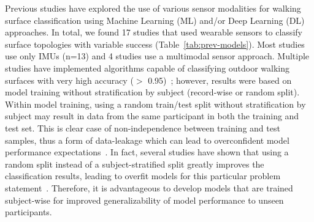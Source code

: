 \documentclass[sensors,article,submit,pdftex,moreauthors]{Definitions/mdpi}
\begin{document}
Previous studies have explored the use of various sensor modalities for walking surface classification using Machine Learning (ML) and/or Deep Learning (DL) approaches. \textcolor{revision}{In total, we found 17 studies that used wearable sensors to classify surface topologies with variable success (Table~\ref{tab:prev-models}). Most studies use only IMUs (n=13) and 4 studies use a multimodal sensor approach.}
Multiple studies have implemented algorithms capable of classifying outdoor walking surfaces with very high accuracy ($>$ 0.95)~\cite{Shah_2022, chauhan2025classifying, yildiz2023towards, Hu_2021, worsey2021automatic, camargo2021machine, kim2021classification, shin2021locomotion, seo2025gait}\textcolor{revision}{; however, results were based on model training without stratification by subject (record-wise or random split). 
Within model training, using a random train/test split without stratification by subject may result in data from the same participant in both the training and test set. \textcolor{revision2}{This is clear case of non-independence between training and test samples, thus a form of data-leakage which can lead to overconfident model performance expectations~\cite{kapoor2023leakage}.} \textcolor{revision2}{In fact,} several studies have shown that using \textcolor{revision2}{a random split instead of a subject-stratified split} greatly improves the classification results, \textcolor{revision2}{leading to overfit models for this particular problem statement~\cite{Shah_2022,  Saeb2017, worsey2021automatic}. Therefore,} it is advantageous to develop models that are trained subject-wise for improved generalizability of model performance to unseen participants.}
\end{document}
